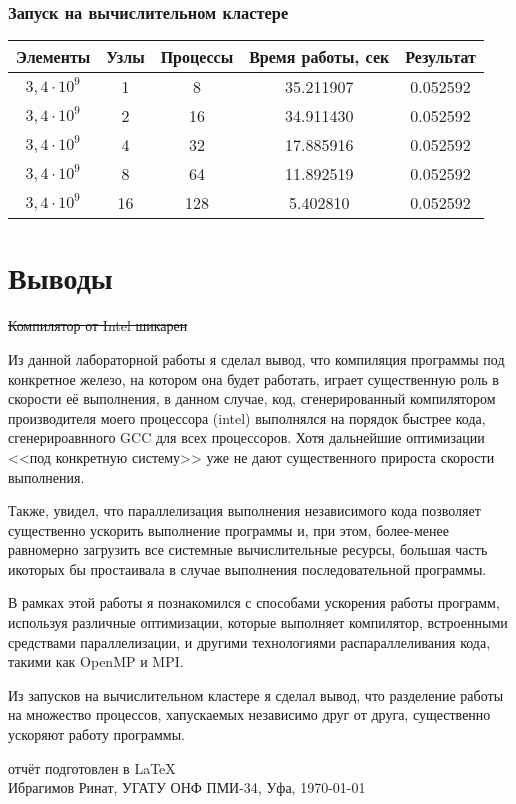 \documentclass[a4paper,12pt]{article}
\begin{document}
\subsubsection{Запуск на вычислительном кластере}
\begin{tabular}{c | c c | c | c}
\textbf{Элементы} & \textbf{Узлы} & \textbf{Процессы} & \textbf{Время работы, сек} & \textbf{Результат}\\
\hline
$3,4\cdot 10^9$ & 1 & 8 & 35.211907 & 0.052592\\
$3,4\cdot 10^9$ & 2 & 16 & 34.911430 & 0.052592\\
$3,4\cdot 10^9$ & 4 & 32 & 17.885916 & 0.052592\\
$3,4\cdot 10^9$ & 8 & 64 & 11.892519 & 0.052592\\
$3,4\cdot 10^9$ & 16 & 128 & 5.402810 & 0.052592\\
\hline
\end{tabular}

\newpage
\section{Выводы}
\sout{Компилятор от Intel шикарен}

Из данной лабораторной работы я сделал вывод, что компиляция программы под конкретное железо, на котором она будет работать, играет существенную роль в скорости её выполнения, в данном случае, код, сгенерированный компилятором производителя моего процессора (intel) выполнялся на порядок быстрее кода, сгенерироавнного GCC для всех процессоров. Хотя дальнейшие оптимизации <<под конкретную систему>> уже не дают существенного прироста скорости выполнения.

Также, увидел, что параллелизация выполнения независимого кода позволяет существенно ускорить выполнение программы и, при этом, более-менее равномерно загрузить все системные вычислительные ресурсы, большая часть икоторых бы простаивала в случае выполнения последовательной программы.

В рамках этой работы я познакомился с способами ускорения работы программ, используя различные оптимизации, которые выполняет компилятор, встроенными средствами параллелизации, и другими технологиями распараллеливания кода, такими как OpenMP и MPI.

Из запусков на вычислительном кластере я сделал вывод, что разделение работы на множество процессов, хапускаемых независимо друг от друга, существенно ускоряют работу программы.
\vfill
\begin{center}
\small отчёт подготовлен в \LaTeX\\
Ибрагимов Ринат, УГАТУ ОНФ ПМИ-34, Уфа, \today
\end{center}
\end{document}
